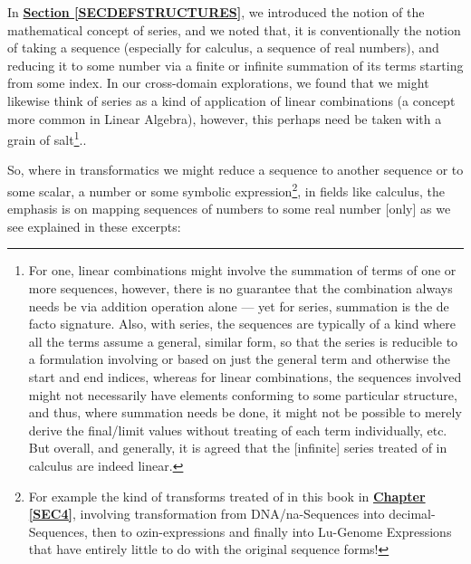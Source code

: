 \documentclass[a4paper, 18pt]{book} %
\begin{document}
\begin{appendices}
In \textbf{\hyperref[SECDEFSTRUCTURES]{Section \ref{SECDEFSTRUCTURES}}}, we introduced the notion of the mathematical concept of series, and we noted that, it is conventionally the notion of taking a sequence (especially for calculus, a sequence of real numbers), and reducing it to some number via a finite or infinite summation of its terms starting from some index\cite{ronlarsoncalculus}\cite{Grossman1986CalculusOneVariable}. In our cross-domain explorations, we found that we might likewise think of series as a kind of application of linear combinations (a concept more common in Linear Algebra), however, this perhaps need be taken with a grain of salt\footnote{For one, linear combinations might involve the summation of terms of one or more sequences, however, there is no guarantee that the combination always needs be via addition operation alone --- yet for series, summation is the de facto signature. Also, with series, the sequences are typically of a kind where all the terms assume a general, similar form, so that the series is reducible to a formulation involving or based on just the general term and otherwise the start and end indices, whereas for linear combinations, the sequences involved might not necessarily have elements conforming to some particular structure, and thus, where summation needs be done, it might not be possible to merely derive the final/limit values without treating of each term individually, etc. But overall, and generally, it is agreed that the [infinite] series treated of in calculus are indeed linear\cite{ronlarsoncalculus}.}.. 


\vspace{2em}


So, where in transformatics we might reduce a sequence to another sequence or to some scalar, a number or some symbolic expression\footnote{For example the kind of transforms treated of in this book in \textbf{\hyperref[SEC4]{Chapter \ref{SEC4}}}, involving transformation from DNA/na-Sequences into decimal-Sequences, then to ozin-expressions and finally into Lu-Genome Expressions that have entirely little to do with the original sequence forms!}, in fields like calculus, the emphasis is on mapping sequences of numbers to some real number [only] as we see explained in these excerpts:

\vspace{2em}

\noindent
\begin{minipage}{1\textwidth}
\vspace{1em}
\begin{quotation}
{\ttfamily

}
\end{quotation}
\end{minipage}
\end{appendices}
\end{document}
